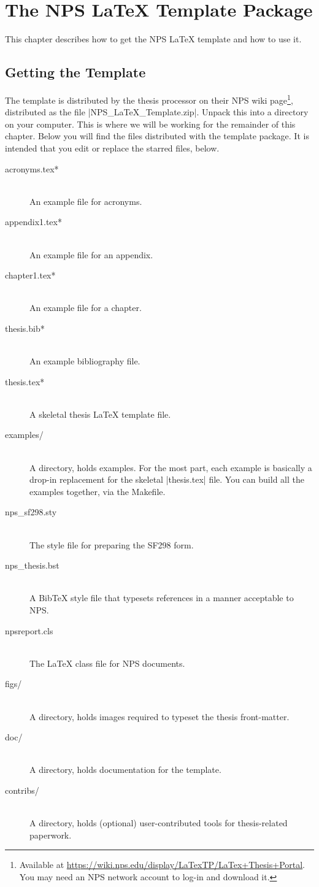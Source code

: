 \chapter{The NPS \LaTeX{} Template Package}
This chapter describes how to get the NPS \LaTeX{} template and how to
use it.

\section{Getting the Template}
The template is distributed by the thesis processor on their
NPS wiki page\footnote{Available at \url{https://wiki.nps.edu/display/LaTexTP/LaTex+Thesis+Portal}.
You may need an NPS network account to log-in and download it.}, distributed as the file |NPS_LaTeX_Template.zip|. 
Unpack this into a directory on your computer. This is where we will be working for the
remainder of this chapter.
Below you will find the files distributed with the template package.
It is intended that you edit or replace the starred files, below.

\begin{description}
\item[acronyms.tex*] \hfill \\ 
An example file for acronyms.
\item[appendix1.tex*] \hfill \\ 
An example file for an appendix.
\item[chapter1.tex*] \hfill \\ 
An example file for a chapter.
\item[thesis.bib*] \hfill \\ 
An example bibliography file.
\item[thesis.tex*] \hfill \\ 
A skeletal thesis \LaTeX{} template file.
\item[examples/] \hfill \\ 
A directory, holds examples. For the most part, 
each example is basically a drop-in replacement for the skeletal |thesis.tex| file.
You can build all the examples together, via the Makefile.
\item[nps\_sf298.sty] \hfill \\ 
The style file for preparing the SF298 form.
\item[nps\_thesis.bst] \hfill \\ 
A Bib\TeX{} style file that typesets references in a manner acceptable to NPS.
\item[npsreport.cls] \hfill \\ 
The \LaTeX{} class file for NPS documents.
\item[figs/] \hfill \\
A directory, holds images required to typeset the thesis front-matter.
\item[doc/] \hfill \\ 
A directory, holds documentation for the template.
\item[contribs/] \hfill \\ 
A directory, holds (optional) user-contributed tools for thesis-related paperwork.
\end{description}






